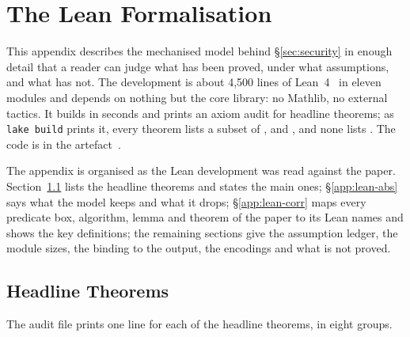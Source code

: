 \section{The Lean Formalisation}\label{app:lean}

This appendix describes the mechanised model behind \S\ref{sec:security}
in enough detail that a reader can judge what has been proved, under
what assumptions, and what has not. The development is about 4{,}500
lines of Lean~4~\cite{lean4} in eleven modules and depends on nothing but the
core library: no Mathlib, no external tactics. It builds in seconds and
prints an axiom audit for \LeanTheoremCount{} headline theorems; as \texttt{lake build}
prints it, every theorem lists a subset of ,
 and , and none lists
. The code is in the artefact~\cite{layertreerepo}.

The appendix is organised as the Lean development was read against the
paper. Section~\ref{app:lean-heads} lists the headline theorems and states
the main ones; \S\ref{app:lean-abs} says what the model keeps and what it
drops; \S\ref{app:lean-corr} maps every predicate box, algorithm, lemma and
theorem of the paper to its Lean names and shows the key definitions;
the remaining sections give the assumption ledger, the module sizes, the
binding to the output, the encodings and what is not proved.


\subsection{Headline Theorems}\label{app:lean-heads}

The audit file  prints one line for each of the
\LeanTheoremCount{} headline theorems, in eight groups.

